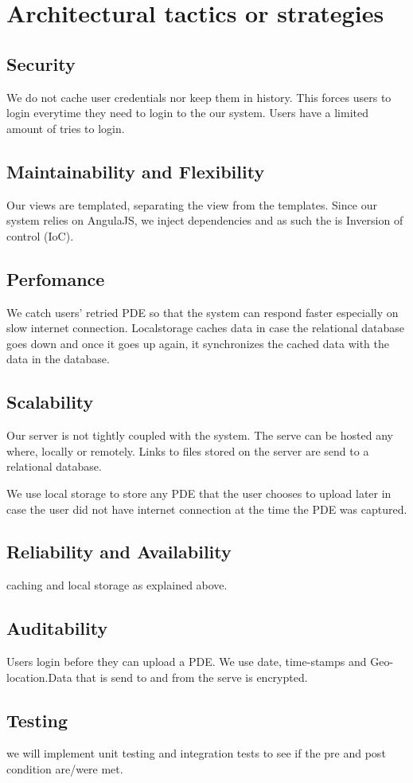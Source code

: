 \documentclass[a4paper,12pt]{article}
\begin{document}
\section{Architectural tactics or strategies}
\subsection{Security} We do not cache user credentials nor keep them in history. This forces users to login everytime they need to login to the our system.  Users have a limited amount of tries to login. 
\subsection{Maintainability and Flexibility} Our views are templated, separating the view from the templates. Since our system relies on AngulaJS, we inject dependencies and as such the is Inversion of control (IoC).
\subsection{Perfomance} We catch users' retried PDE so that the system can respond faster especially on slow internet connection. Localstorage caches data in case the relational database goes down and once it goes up again, it synchronizes the cached data with the data in the database.
\subsection{Scalability} Our server is not tightly coupled with the system. The serve can be hosted any where, locally or remotely. Links to files stored on the server are send to a relational database.

We use local storage to store any PDE that the user chooses to upload later in case the user did not have internet connection at the time the PDE was captured.
\subsection{Reliability and Availability} caching and local storage as explained above.
\subsection{Auditability} Users login before they can upload a PDE. We use date, time-stamps and Geo-location.Data that is send to and from the serve is encrypted.
\subsection{Testing}we will implement unit testing and integration tests to see if the pre and post condition are/were met.
\end{document}
